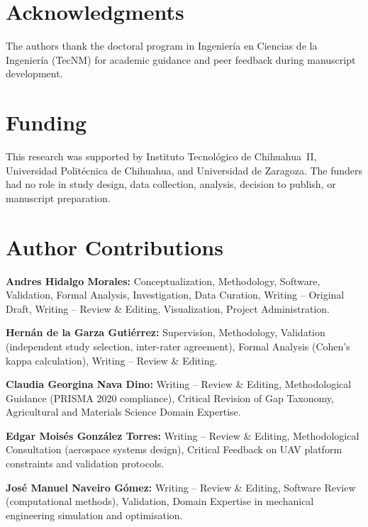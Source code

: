 \documentclass[review,3p]{elsarticle}
\begin{document}
\section*{Acknowledgments}
The authors thank the doctoral program in Ingeniería en Ciencias de la
Ingeniería (TecNM) for academic guidance and peer feedback during manuscript
development.

\section*{Funding}
This research was supported by Instituto Tecnológico de Chihuahua~II,
Universidad Politécnica de Chihuahua, and Universidad de Zaragoza. The
funders had no role in study design, data collection, analysis, decision to
publish, or manuscript preparation.

\section*{Author Contributions}
\textbf{Andres Hidalgo Morales:} Conceptualization, Methodology, Software,
Validation, Formal Analysis, Investigation, Data Curation, Writing -- Original
Draft, Writing -- Review \& Editing, Visualization, Project Administration.

\textbf{Hernán de la Garza Gutiérrez:} Supervision, Methodology, Validation
(independent study selection, inter-rater agreement), Formal Analysis
(Cohen's kappa calculation), Writing -- Review \& Editing.

\textbf{Claudia Georgina Nava Dino:} Writing -- Review \& Editing,
Methodological Guidance (PRISMA 2020 compliance), Critical Revision of Gap
Taxonomy, Agricultural and Materials Science Domain Expertise.

\textbf{Edgar Moisés González Torres:} Writing -- Review \& Editing,
Methodological Consultation (aerospace systems design), Critical Feedback on
UAV platform constraints and validation protocols.

\textbf{José Manuel Naveiro Gómez:} Writing -- Review \& Editing, Software
Review (computational methods), Validation, Domain Expertise in mechanical
engineering simulation and optimisation.
\end{document}
